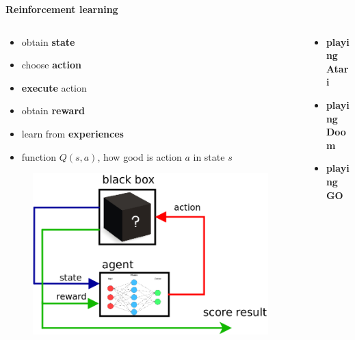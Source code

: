 \documentclass[xcolor=dvipsnames]{beamer}
\begin{document}
\begin{frame}{\bf Reinforcement learning}

\begin{columns}
\begin{column}{0.5\textwidth}

    \begin{itemize}
      \item obtain {\bf state}
      \item choose {\bf action}
      \item {\bf execute} action
      \item obtain {\bf reward}
      \item learn from {\bf experiences}
      \item function {\bf $Q(s, a)$}, how good is action $a$ in state $s$
    \end{itemize}

      \begin{figure}
        \includegraphics[scale=0.2]{../../diagrams/rl_mechanism.png}
      \end{figure}

\end{column}
\begin{column}{0.5\textwidth}  %

      \begin{itemize}
      \item {\bf playing Atari}
      \item {\bf playing Doom}
      \item {\bf playing GO}
    \end{itemize}



\end{column}
\end{columns}
\end{frame}
\end{document}

